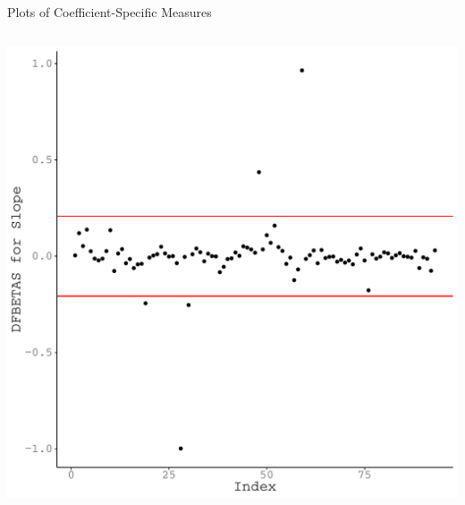 \documentclass{beamer}\usepackage[]{graphicx}\usepackage[]{color}
\makeatletter
\def\maxwidth{ %
  \ifdim\Gin@nat@width>\linewidth
    \linewidth
  \else
    \Gin@nat@width
  \fi
}
\newenvironment{knitrout}{}{} %
\makeatother
\begin{document}
\begin{frame}{Plots of Coefficient-Specific Measures}
\begin{columns}
\begin{column}{0.5\textwidth}
\begin{knitrout}
{\centering \includegraphics[width=\maxwidth]{figure/unnamed-chunk-33-1} 

}



\end{knitrout}

\end{column}
\end{columns}

\end{frame}

\end{document}
